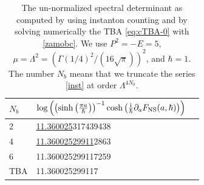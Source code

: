 \documentclass[a4paper,11pt]{article}
\theoremstyle{definition}
\newcommand{\ri}{{\rm i}}
\begin{document}
 \begin{table}[h!] 
\centering
   \begin{tabular}{l l l}
  \\
 $N_b$& $\log\left(\left( \sinh\left(\frac{\pi a}{\hbar }\right) \right)^{-1} \cosh\left({\ri \over \hbar}\partial_{a}F_{\rm NS}(a, \hbar)\right)\right)$  \\
\hline
 2 &\underline{11.360025}317439438\\
 4 &\underline{11.36002529911}2863\\ 
  6&11.360025299117259\\  
 \hline
TBA &  11.360025299117    \\
\end{tabular}    \\
\caption{ The un-normalized spectral determinant as computed 
by using instanton counting and 
by solving numerically  the TBA \eqref{eq:cTBA-0} with \eqref{zamobc}.  We use $P^2=-E=5$, $\mu=\Lambda^2=\left(\Gamma \left(1/4\right)^2/(16 \sqrt{\pi })\right)^2$, and $\hbar=1$. The number $N_b$ means that we truncate the series \eqref{inst}  at order $\Lambda^{4 N_b}$. }
 \label{TestTBA1}
 \end{table}
   
\end{document}
